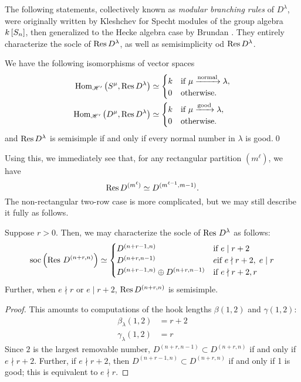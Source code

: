 \documentclass{amsart}
\begin{document}
  The following statements, collectively known as \emph{modular branching rules} of $D^\lambda$, were originally written by Kleshchev for Specht modules of the group algebra $k\left[ S_n \right]$, then generalized to the Hecke algebra case by Brundan \cite{Kleshchev,Brundan}. 
  They entirely characterize the socle of $\operatorname{Res} D^\lambda$, as well as semisimplicity od $\operatorname{Res} D^\lambda$.
  \begin{theorem}
    We have the following isomorphisms of vector spaces
    \begin{align*}
      \operatorname{Hom}_{\mathscr{H}'}\left( S^\mu,\operatorname{Res} D^\lambda \right) 
      &\simeq \begin{cases}
        k & \text{if }\mu \xrightarrow{\text{normal}} \lambda,\\
        0 & \text{otherwise}.
      \end{cases}\\
      \operatorname{Hom}_{\mathscr{H}'}\left( D^\mu,\operatorname{Res} D^\lambda \right) 
      &\simeq \begin{cases}
        k & \text{if } \mu \xrightarrow{\text{good}} \lambda,\\
        0 & \text{otherwise}.
      \end{cases}
    \end{align*}
    and $\operatorname{Res} D^\lambda$ is semisimple if and only if every normal number in $\lambda$ is good.\qed
  \end{theorem}

  Using this, we immediately see that, for any rectangular partition $(m^\ell)$, we have
  \[
    \operatorname{Res} D^{(m^\ell)} \simeq D^{(m^{\ell-1},m-1)}.
  \]
  The non-rectangular two-row case is more complicated, but we may still describe it fully as follows.
  \begin{corollary}\label{D Restrictions}
    Suppose $r > 0$.
    Then, we may characterize the socle of $\operatorname{Res} \, D^\lambda$ as follows:
    \[
      \operatorname{soc}\left( \operatorname{Res} \, D^{(n+r,n)} \right) \simeq \begin{cases}
        D^{(n + r - 1,n)} & \text{if }e \mid r+2\\
        D^{(n + r,n-1)} &e \text{if }e\nmid r+2, \; e \mid r\\
        D^{(n+r-1,n)} \oplus D^{(n+r,n-1)} & \text{if } e \nmid r+2,r
      \end{cases}
    \]
    Further, when $e \nmid r$ or $e \mid r + 2$, $\operatorname{Res} D^{(n+r,n)}$ is semisimple.
  \end{corollary}
  \begin{proof}
    This amounts to computations of the hook lengths $\beta(1,2)$ and $\gamma(1,2)$:
    \begin{align*}
      \beta_\lambda(1,2) &= r + 2\\
      \gamma_\lambda(1,2) &= r
    \end{align*}
    Since $2$ is the largest removable number, $D^{(n+r,n-1)} \subset D^{(n+r,n)}$ if and only if $e \nmid r + 2$.
    Further, if $e \nmid r + 2$, then $D^{(n+r-1,n)} \subset D^{(n+r,n)}$ if and only if 1 is good;
    this is equivalent to $e \nmid r$.
  \end{proof}
\end{document}
